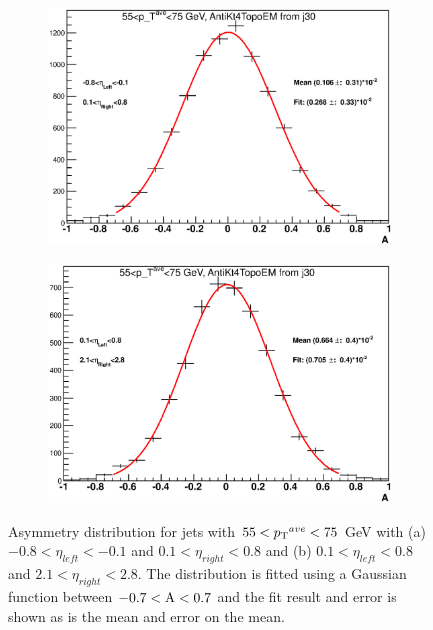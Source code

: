 \begin{figure}
\centering
        \begin{subfigure}[b]{0.8\textwidth}
                \centering
                \includegraphics[width=\textwidth]{figures/JetPerformance/2011/j30zvar4_6.eps}
        \end{subfigure}%

        \begin{subfigure}[b]{0.8\textwidth}
                \centering
                \includegraphics[width=\textwidth]{figures/JetPerformance/2011/j30zvar6_9.eps}
        \end{subfigure}%

\caption[Example asymmetry distribution for jets with $55<\ptave{}<75$ GeV]{
Asymmetry distribution for jets with $55<\ptave{}<75$ GeV with (a) $-0.8<\eta_{left}<-0.1$ and $0.1<\eta_{right}<0.8$ and (b)  $0.1<\eta_{left}<0.8$ and $2.1<\eta_{right}<2.8$.
The distribution is fitted using a Gaussian function between $\rm{-0.7<A<0.7}$ and the fit result and error is shown as is the mean and error on the mean. 
\label{JetPerf:Asym_j30}}
\end{figure}

